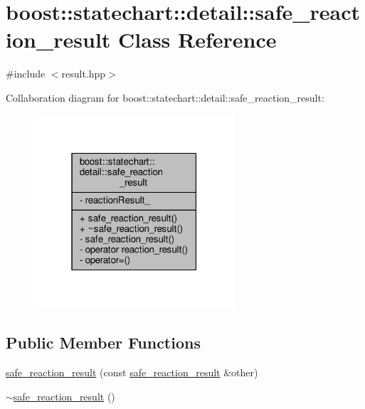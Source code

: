 \hypertarget{classboost_1_1statechart_1_1detail_1_1safe__reaction__result}{}\section{boost\+:\+:statechart\+:\+:detail\+:\+:safe\+\_\+reaction\+\_\+result Class Reference}
\label{classboost_1_1statechart_1_1detail_1_1safe__reaction__result}


{\ttfamily \#include $<$result.\+hpp$>$}



Collaboration diagram for boost\+:\+:statechart\+:\+:detail\+:\+:safe\+\_\+reaction\+\_\+result\+:
\nopagebreak
\begin{figure}[H]
\begin{center}
\leavevmode
\includegraphics[width=211pt]{classboost_1_1statechart_1_1detail_1_1safe__reaction__result__coll__graph}
\end{center}
\end{figure}
\subsection*{Public Member Functions}
\begin{DoxyCompactItemize}
\item 
\mbox{\hyperlink{classboost_1_1statechart_1_1detail_1_1safe__reaction__result_a6b06eb2544846a2fefd144a559b1f1e7}{safe\+\_\+reaction\+\_\+result}} (const \mbox{\hyperlink{classboost_1_1statechart_1_1detail_1_1safe__reaction__result}{safe\+\_\+reaction\+\_\+result}} \&other)
\item 
\mbox{\hyperlink{classboost_1_1statechart_1_1detail_1_1safe__reaction__result_acdb8937552e5f97a7f244fb32401906d}{$\sim$safe\+\_\+reaction\+\_\+result}} ()
\end{DoxyCompactItemize}
